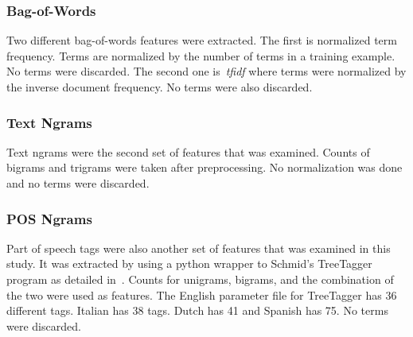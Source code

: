 \documentclass[a4paper]{llncs}
\begin{document}
\subsubsection{Bag-of-Words}

Two different bag-of-words features were extracted. The first is normalized term frequency. Terms are normalized by the number of terms in a training example. No terms were discarded. The second one is~\textit{tfidf} where terms were normalized by the inverse document frequency. No terms were also discarded. 

\subsubsection{Text Ngrams}
Text ngrams were the second set of features that was examined. Counts of bigrams and trigrams were taken after preprocessing. No normalization was done and no terms were discarded. 

\subsubsection{POS Ngrams}
Part of speech tags were also another set of features that was examined in this study. It was extracted by using a python wrapper to Schmid's TreeTagger program as detailed in~\cite{schmid1994probabilistic}. Counts for unigrams, bigrams, and the combination of the two were used as features. The English parameter file for TreeTagger has 36 different tags. Italian has 38 tags. Dutch has 41 and Spanish has 75. No terms were discarded.




\end{document}
